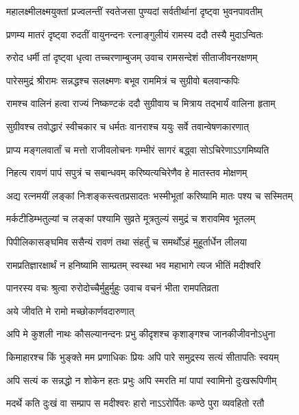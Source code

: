 \twolineshloka
{महालक्ष्मीलक्ष्मयुक्तां प्रज्वलन्तीं स्वतेजसा}
{पुण्यदां सर्वतीर्थानां दृष्ट्वा भुवनपावतीम्}%


\twolineshloka
{प्रणम्य मातरं दृष्ट्वा रुदतीं वायुनन्दनः}
{रत्नाङ्गुलीयं रामस्य ददौ तस्यै मुदाऽन्वितः}%


\twolineshloka
{रुरोद धर्मी तां दृष्ट्वा धृत्वा तच्चरणाम्बुजम्}
{उवाच रामसन्देशं सीताजीवनरक्षणम्}%


\twolineshloka
{पारेसमुद्रं श्रीरामः सन्नद्धश्च सलक्ष्मणः}
{बभूव राममित्रं च सुग्रीवो बलवान्कपिः}%


\twolineshloka
{रामश्च वालिनं हत्वा राज्यं निष्कण्टकं ददौ}
{सुग्रीवाय च मित्राय तद्भार्यं वालिना हृताम्}%


\twolineshloka
{सुग्रीवश्च तवोद्धारं स्वीचकार च धर्मतः}
{वानराश्च ययुः सर्वे तवान्वेषणकारणात्}%


\twolineshloka
{प्राप्य मङ्गलवार्तां च मत्तो राजीवलोचनः}
{गम्भीरं सागरं बद्ध्वा सोऽचिरेणाऽऽगमिष्यति}%


\twolineshloka
{निहत्य रावणं पापं सपुत्रं च सबान्धवम्}
{करिष्यत्यचिरेणैव हे मातस्तव मोक्षणम्}%


\twolineshloka
{अद्य रत्नमयीं लङ्कां निःशङ्कस्त्वतप्रसादतः}
{भस्मीभूतां करिष्यामि मातः पश्य च सस्मितम्}%


\twolineshloka
{मर्कटीडिम्भतुल्यां च लङ्कां पश्यामि सुव्रते}
{मूत्रतुल्यं समुद्रं च शरावमिव भूतलम्}%


\twolineshloka
{पिपीलिकासङ्घमिव ससैन्यं रावणं तथा}
{संहर्तुं च समर्थोंऽहं मुहूर्तार्धेन लीलया}%


\twolineshloka
{रामप्रतिज्ञारक्षार्थं न हनिष्यामि साम्प्रतम्}
{स्वस्था भव महाभागे त्यज भीतिं मदीश्वरि}%


\twolineshloka
{पानरस्य वचः श्रुत्वा रुरोदोच्चैर्मुहुर्मुहुः}
{उवाच वचनं भीता रामपतिव्रता}%


\onelineshloka
{अये जीवति मे रामो मच्छोकार्णवदारुणात्}%


\twolineshloka
{अपि मे कुशली नाथः कौसल्यानन्दनः प्रभु}
{कीदृशश्च कृशाङ्गश्च जानकीजीवनोऽधुना}%


\twolineshloka
{किमाहारश्च किं भुङ्क्ते मम प्रणाधिकः प्रियः}
{अपि पारे समुद्रस्य सत्यं सीतापतिः स्वयम्}%


\twolineshloka
{अपि सत्यं क सन्नद्धो न शोकेन हतः प्रभुः}
{अपि स्मरति मां पापां स्वामिनो दुःखरूपिणीम्}%


\twolineshloka
{मदर्थे कति दुःखं वा सम्प्राप स मदीश्वरः}
{हारो नाऽऽरोर्पितः कण्ठे पुरा व्यवहितो रतौ}%


